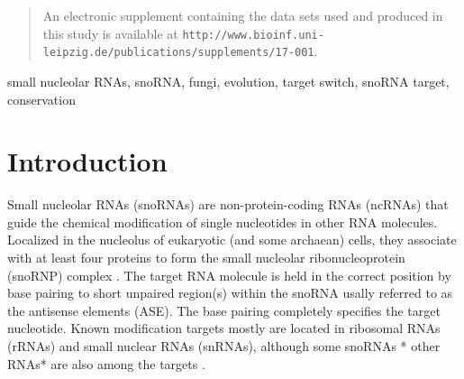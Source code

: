 \documentclass[preprint,3p,times,twocolumn]{elsarticle}
\newcommand{\TODO}[1] {\begingroup\color{red}#1\endgroup}
\newcommand{\url}[1]{\texttt{\small #1}}
\begin{document}
\begin{frontmatter}
\begin{abstract}
  
  An electronic supplement containing the data sets used and produced in
  this study is available at
  \url{http://www.bioinf.uni-leipzig.de/publications/supplements/17-001}. 
\end{abstract}

\begin{keyword}
  small nucleolar RNAs, snoRNA, fungi, evolution, target switch, snoRNA target, 	
  conservation	
\end{keyword}

\end{frontmatter}


\section{Introduction}

Small nucleolar RNAs (snoRNAs) are non-protein-coding RNAs (ncRNAs) that
guide the chemical modification of single nucleotides in other RNA
molecules.  Localized in the nucleolus of eukaryotic (and some archaean)
cells, they associate with at least four proteins to form the small
nucleolar ribonucleoprotein (snoRNP) complex \cite{****}.  The target RNA
molecule is held in the correct position by base pairing to short unpaired
region(s) within the snoRNA usally referred to as the antisense elements
(ASE). The base pairing completely specifies the target nucleotide. Known
modification targets mostly are located in ribosomal RNAs (rRNAs) and small
nuclear RNAs (snRNAs), although some snoRNAs \TODO{* other RNAs* } are also
among the targets \cite{Clouet_d'Orval:2001, Dennis:2001, Uliel:2004,
  Cavaillé:2000, Kishore:2006, Kiss:2002, Matera:2007, Bratkovi:2011}.
\end{document}
